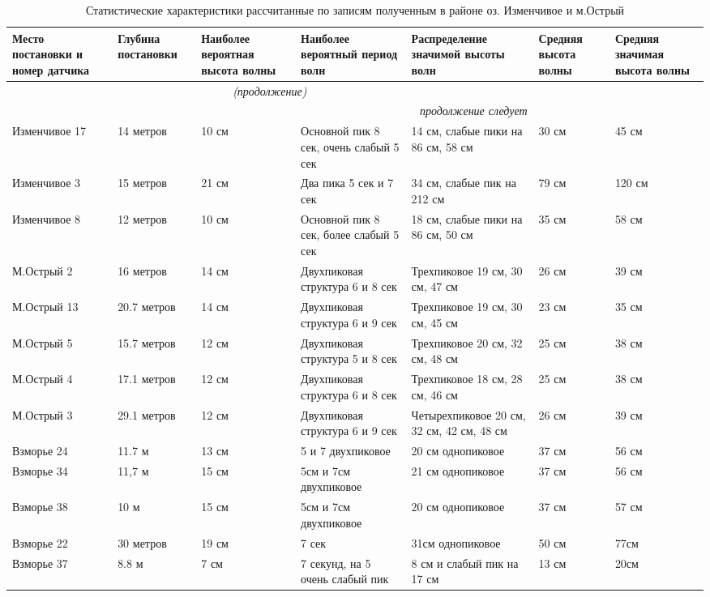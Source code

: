 \begin{longtable}{|X |X |X |X| X| X| X|}
\caption{Статистические характеристики рассчитанные по записям полученным в районе оз. Изменчивое и м.Острый}\label{tbl:charact}\\
    \hline
        \textbf{Место постановки и номер датчика} & \textbf{Глубина постановки} & \textbf{Наиболее вероятная высота волны } & \textbf{Наиболее вероятный период волн} & \textbf{Распреде\-ление значимой высоты волн} & \textbf{Средняя высота волны } & \textbf{Средняя значимая высота волны } \\
    \hline
        \endfirsthead
    \hline
        \multicolumn{5}{c}{\small\slshape (продолжение)} \\
    \hline
        \endhead
    \hline
        \multicolumn{5}{|r|}{\small\slshape продолжение следует}  \\
    \hline
        \endfoot
    \hline
        \endlastfoot
    \hline
Изменчивое 17 & 14  метров & 10 см & Основной пик 8 сек, очень слабый 5 сек & 14 см, слабые пики на 86 см, 58 см  & 30 см & 45 см \\
\hline
Изменчивое 3 & 15 метров & 21 см & Два пика 5 сек и 7 сек & 34 см, слабые пик на 212 см & 79 см & 120 см \\
\hline
Изменчивое 8 & 12 метров & 10 см & Основной пик 8 сек, более слабый 5 сек & 18 см, слабые пики на 86 см, 50 см & 35 см & 58 см \\
\hline
М.Острый 2  & 16 метров & 14 см  & Двухпиковая структура 6 и 8 сек & Трехпиковое 19 см, 30 см, 47 см & 26 см  & 39 см  \\
\hline
М.Острый 13  & 20.7 метров & 14 см  & Двухпиковая структура 6 и 9 сек & Трехпиковое 19 см, 30 см, 45 см & 23 см  & 35 см  \\
\hline
М.Острый 5  & 15.7 метров & 12 см  & Двухпиковая структура 5 и 8 сек & Трехпиковое 20 см, 32 см, 48 см & 25 см  & 38 см  \\
\hline
М.Острый 4  & 17.1 метров & 12 см  & Двухпиковая структура 6 и 8 сек & Трехпиковое 18 см, 28 см, 46 см & 25 см  & 38 см  \\
\hline
М.Острый 3  & 29.1 метров & 12 см  & Двухпиковая структура 6 и 9 сек & Четырехпиковое 20 см, 32 см, 42 см, 48 см & 26 см  & 39 см  \\
\hline
Взморье 24  & 11.7 м & 13 см  & 5 и 7 двухпиковое & 20 см однопиковое & 37 см  & 56 см  \\
\hline
Взморье 34  & 11,7 м & 15 см  & 5см и 7см двухпиковое & 21 см однопиковое & 37 см  & 56 см  \\
\hline
Взморье 38  & 10 м & 15 см  & 5см и 7см двухпиковое & 20 см однопиковое & 37 см  & 57 см \\
\hline
Взморье 22  & 30 метров & 19 см  & 7 сек & 31см однопиковое & 50 см  & 77см  \\
\hline
Взморье 37  & 8.8 м & 7 см  & 7 секунд, на 5 очень слабый пик & 8 см и слабый пик на 17 см  & 13 см  & 20см  \\
\hline
\end{longtable}
